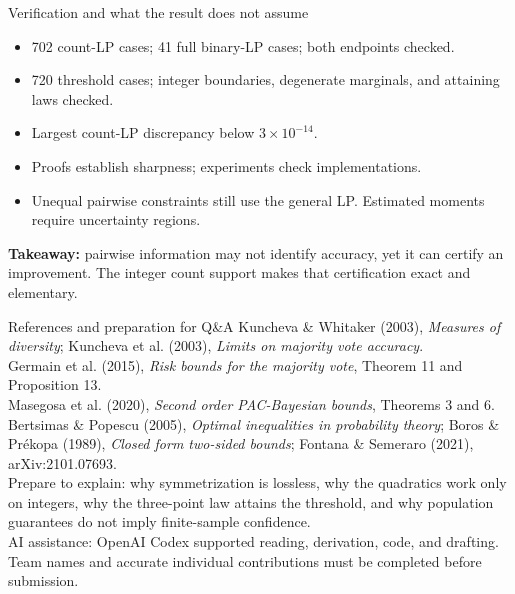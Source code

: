\documentclass[aspectratio=169]{beamer}
\begin{document}
\begin{frame}{Verification and what the result does not assume}
\begin{itemize}
\item 702 count-LP cases; 41 full binary-LP cases; both endpoints checked.
\item 720 threshold cases; integer boundaries, degenerate marginals, and attaining laws checked.
\item Largest count-LP discrepancy below $3\times10^{-14}$.
\item Proofs establish sharpness; experiments check implementations.
\item Unequal pairwise constraints still use the general LP. Estimated moments require uncertainty regions.
\end{itemize}
\medskip
\textbf{Takeaway:} pairwise information may not identify accuracy, yet it can certify an improvement. The integer count support makes that certification exact and elementary.
\end{frame}
\begin{frame}{References and preparation for Q\&A}
\footnotesize
Kuncheva \& Whitaker (2003), \emph{Measures of diversity}; Kuncheva et al. (2003), \emph{Limits on majority vote accuracy}.\\[.4em]
Germain et al. (2015), \emph{Risk bounds for the majority vote}, Theorem 11 and Proposition 13.\\[.4em]
Masegosa et al. (2020), \emph{Second order PAC-Bayesian bounds}, Theorems 3 and 6.\\[.4em]
Bertsimas \& Popescu (2005), \emph{Optimal inequalities in probability theory}; Boros \& Pr\'ekopa (1989), \emph{Closed form two-sided bounds}; Fontana \& Semeraro (2021), arXiv:2101.07693.\\[1em]
Prepare to explain: why symmetrization is lossless, why the quadratics work only on integers, why the three-point law attains the threshold, and why population guarantees do not imply finite-sample confidence.\\[.7em]
AI assistance: OpenAI Codex supported reading, derivation, code, and drafting. Team names and accurate individual contributions must be completed before submission.
\end{frame}
\end{document}
